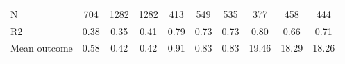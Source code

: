 \begin{tabular}{lccc|ccc|ccc}
N           &         704         &        1282         &        1282         &         413         &         549         &         535         &         377         &         458         &         444         \\
R2          &        0.38         &        0.35         &        0.41         &        0.79         &        0.73         &        0.73         &        0.80         &        0.66         &        0.71         \\
Mean outcome&        0.58         &        0.42         &        0.42         &        0.91         &        0.83         &        0.83         &       19.46         &       18.29         &       18.26         \\
\bottomrule \end{tabular}
